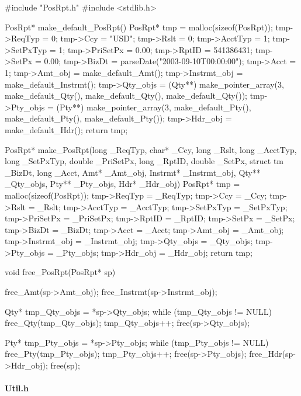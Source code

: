 \documentclass[submission]{eptcs}
\begin{document}
\begin{ccode}
#include "PosRpt.h"
#include <stdlib.h>

PosRpt* make_default_PosRpt() {
  PosRpt* tmp = malloc(sizeof(PosRpt));
  tmp->ReqTyp = 0;
  tmp->Ccy = "USD";
  tmp->Rslt = 0;
  tmp->AcctTyp = 1;
  tmp->SetPxTyp = 1;
  tmp->PriSetPx = 0.00;
  tmp->RptID = 541386431;
  tmp->SetPx = 0.00;
  tmp->BizDt = parseDate("2003-09-10T00:00:00");
  tmp->Acct = 1;
  tmp->Amt_obj = make_default_Amt();
  tmp->Instrmt_obj = make_default_Instrmt();
  tmp->Qty_objs = (Qty**) make_pointer_array(3, make_default_Qty(),
                                                make_default_Qty(),
                                                make_default_Qty());
  tmp->Pty_objs = (Pty**) make_pointer_array(3, make_default_Pty(),
                                                make_default_Pty(),
                                                make_default_Pty());
  tmp->Hdr_obj = make_default_Hdr();
  return tmp;
}

PosRpt* make_PosRpt(long _ReqTyp, char* _Ccy, long _Rslt, long _AcctTyp, long _SetPxTyp, double _PriSetPx,
                    long _RptID, double _SetPx, struct tm _BizDt, long _Acct, Amt* _Amt_obj,
                    Instrmt* _Instrmt_obj, Qty** _Qty_objs, Pty** _Pty_objs, Hdr* _Hdr_obj) {
  PosRpt* tmp = malloc(sizeof(PosRpt));
  tmp->ReqTyp = _ReqTyp;
  tmp->Ccy = _Ccy;
  tmp->Rslt = _Rslt;
  tmp->AcctTyp = _AcctTyp;
  tmp->SetPxTyp = _SetPxTyp;
  tmp->PriSetPx = _PriSetPx;
  tmp->RptID = _RptID;
  tmp->SetPx = _SetPx;
  tmp->BizDt = _BizDt;
  tmp->Acct = _Acct;
  tmp->Amt_obj = _Amt_obj;
  tmp->Instrmt_obj = _Instrmt_obj;
  tmp->Qty_objs = _Qty_objs;
  tmp->Pty_objs = _Pty_objs;
  tmp->Hdr_obj = _Hdr_obj;
  return tmp;
}

void free_PosRpt(PosRpt* sp) {
  free_Amt(sp->Amt_obj);
  free_Instrmt(sp->Instrmt_obj);

  Qty* tmp_Qty_objs = *sp->Qty_objs;
  while (tmp_Qty_objs != NULL) {
    free_Qty(tmp_Qty_objs);
    tmp_Qty_objs++;
  }
  free(sp->Qty_objs);

  Pty* tmp_Pty_objs = *sp->Pty_objs;
  while (tmp_Pty_objs != NULL) {
    free_Pty(tmp_Pty_objs);
    tmp_Pty_objs++;
  }
  free(sp->Pty_objs);
  free_Hdr(sp->Hdr_obj);
  free(sp);
}
\end{ccode}

\paragraph{Util.h}
\end{document}
